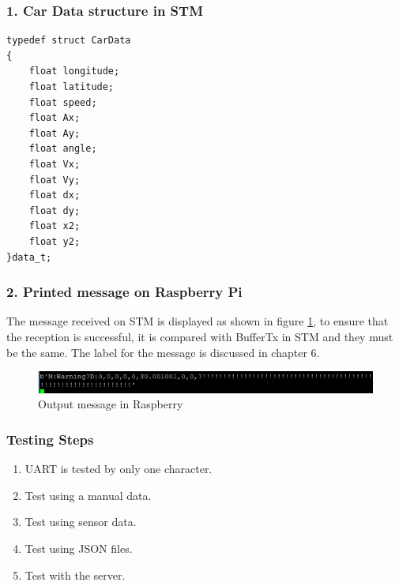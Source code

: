 \subsubsection{1. Car Data structure in STM}
\begin{lstlisting}
typedef struct CarData
{
	float longitude;
	float latitude;
	float speed;
	float Ax;
	float Ay;
	float angle;
	float Vx;
	float Vy;
	float dx;
	float dy;
	float x2;
	float y2;
}data_t;
\end{lstlisting}

\subsubsection{2. Printed message on Raspberry Pi}
The message received on STM is displayed as shown in figure \ref{fig:output-rasp}, to ensure that the reception is successful, it is compared with BufferTx in STM and they must be the same. The label for the message is discussed in chapter 6.

\begin{figure}[h]
    \centering
    \includegraphics[width = \textwidth]{figure/5_20.PNG}
    \caption{Output message in Raspberry}
    \label{fig:output-rasp}
    \end{figure}
\newpage 

\subsubsection{Testing Steps}
\begin{enumerate}
    \item UART is tested by only one character.
    \item Test using a manual data.
    \item Test using sensor data.
    \item Test using JSON files.
    \item Test with the server.
\end{enumerate}